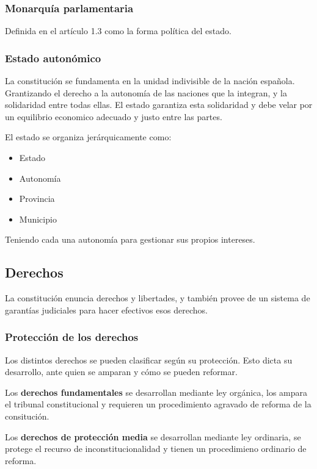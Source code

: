     \subsubsection{Monarquía parlamentaria}
        Definida en el artículo 1.3 como la forma política del estado.

    \subsubsection{Estado autonómico}
        La constitución se fundamenta en la unidad indivisible de la nación española. Grantizando el derecho a la autonomía de las naciones que la integran, y la solidaridad entre todas ellas. El estado garantiza esta solidaridad y debe velar por un equilibrio  economico adecuado y justo entre las partes.

        El estado se organiza jerárquicamente como:
        \begin{itemize}
            \item Estado
            \item Autonomía
            \item Provincia
            \item Municipio
        \end{itemize}
        Teniendo cada una autonomía para gestionar sus propios intereses. 

\subsection{Derechos}
    La constitución enuncia derechos y libertades, y también provee de un sistema de garantías judiciales para hacer efectivos esos derechos.    

    \subsubsection{Protección de los derechos}
        Los distintos derechos se pueden clasificar según su protección. Esto dicta su desarrollo, ante quien se amparan y cómo se pueden reformar.

        Los \textbf{derechos fundamentales} se desarrollan mediante ley orgánica, los ampara el tribunal constitucional y requieren un procedimiento agravado de reforma de la consitución.

        Los \textbf{derechos de protección media} se desarrollan mediante ley ordinaria, se protege el recurso de inconstitucionalidad y tienen un procedimieno ordinario de reforma.

